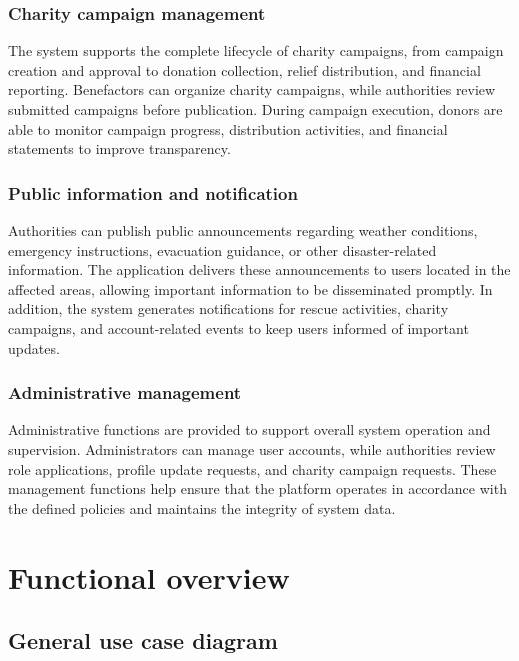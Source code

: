\documentclass[../Main.tex]{subfiles}
\begin{document}
\subsubsection{Charity campaign management}
\label{subsubsection:charity_campaign_management}
The system supports the complete lifecycle of charity campaigns, from campaign creation and approval to donation collection, relief distribution, and financial reporting. Benefactors can organize charity campaigns, while authorities review submitted campaigns before publication. During campaign execution, donors are able to monitor campaign progress, distribution activities, and financial statements to improve transparency.

\subsubsection{Public information and notification}
\label{subsubsection:public_information_notification}
Authorities can publish public announcements regarding weather conditions, emergency instructions, evacuation guidance, or other disaster-related information. The application delivers these announcements to users located in the affected areas, allowing important information to be disseminated promptly. In addition, the system generates notifications for rescue activities, charity campaigns, and account-related events to keep users informed of important updates.

\subsubsection{Administrative management}
\label{subsubsection:administrative_management}
Administrative functions are provided to support overall system operation and supervision. Administrators can manage user accounts, while authorities review role applications, profile update requests, and charity campaign requests. These management functions help ensure that the platform operates in accordance with the defined policies and maintains the integrity of system data.

\section{Functional overview}
\label{section:2.2}
\subsection{General use case diagram}
\label{subsection:2.2.1}
\end{document}
